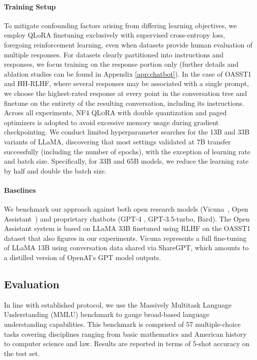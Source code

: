 \paragraph{Training Setup} To mitigate confounding factors arising from differing learning objectives, we employ QLoRA finetuning exclusively with supervised cross-entropy loss, foregoing reinforcement learning, even when datasets provide human evaluation of multiple responses. For datasets clearly partitioned into instructions and responses, we focus training on the response portion only (further details and ablation studies can be found in Appendix \ref{app:chatbot}). In the case of OASST1 and HH-RLHF, where several responses may be associated with a single prompt, we choose the highest-rated response at every point in the conversation tree and finetune on the entirety of the resulting conversation, including its instructions. Across all experiments, NF4 \textsc{QLoRA} with double quantization and paged optimizers is adopted to avoid excessive memory usage during gradient checkpointing. We conduct limited hyperparameter searches for the 13B and 33B variants of LLaMA, discovering that most settings validated at 7B transfer successfully (including the number of epochs), with the exception of learning rate and batch size. Specifically, for 33B and 65B models, we reduce the learning rate by half and double the batch size.

\paragraph{Baselines} We benchmark our approach against both open research models (Vicuna~\citep{vicuna2023}, Open Assistant~\citep{kopf2023openassistant}) and proprietary chatbots (GPT-4 \citep{openai2023gpt}, GPT-3.5-turbo, Bard). The Open Assistant system is based on LLaMA 33B finetuned using RLHF on the OASST1 dataset that also figures in our experiments. Vicuna represents a full fine-tuning of LLaMA 13B using conversation data shared via ShareGPT, which amounts to a distilled version of OpenAI’s GPT model outputs.

\subsection{Evaluation}

In line with established protocol, we use the Massively Multitask Language Understanding (MMLU) benchmark \citep{hendrycksmeasuring} to gauge broad-based language understanding capabilities. This benchmark is comprised of 57 multiple-choice tasks covering disciplines ranging from basic mathematics and American history to computer science and law. Results are reported in terms of 5-shot accuracy on the test set.

